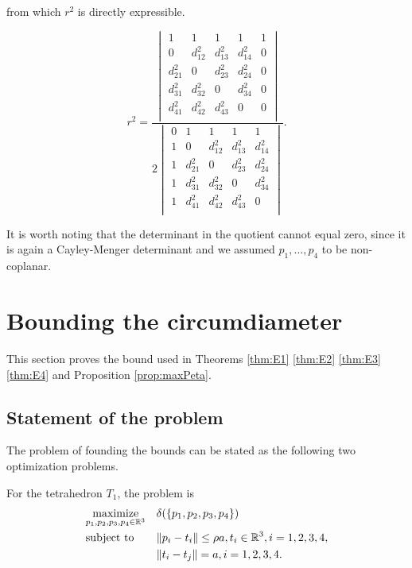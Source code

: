 from which $r^2$ is directly expressible.

\begin{equation}\label{eq:Cayley-Menger-expanded}
r^2 
=
\frac{
\begin{vmatrix}
1 & 1 & 1 & 1 & 1 \\
0 & d^2_{12} & d^2_{13} & d^2_{14} & 0 \\
d^2_{21} & 0 & d^2_{23} & d^2_{24} & 0 \\
d^2_{31} & d^2_{32} & 0 & d^2_{34} & 0 \\ 
d^2_{41} & d^2_{42} & d^2_{43} & 0 & 0 \\
\end{vmatrix}}
{2 \begin{vmatrix}
0 & 1 & 1 & 1 & 1 \\
1 & 0 & d^2_{12} & d^2_{13} & d^2_{14} \\
1 & d^2_{21} & 0 & d^2_{23} & d^2_{24} \\
1 & d^2_{31} & d^2_{32} & 0 & d^2_{34} \\ 
1 & d^2_{41} & d^2_{42} & d^2_{43} & 0 \\
\end{vmatrix} 
}.
\end{equation}

It is worth noting that the determinant in the quotient cannot equal zero, since it is again a Cayley-Menger determinant and we assumed $p_1,\dots,p_4$ to be non-coplanar. 



\section{Bounding the circumdiameter}
This section proves the bound used in Theorems \ref{thm:E1} \ref{thm:E2} \ref{thm:E3} \ref{thm:E4} and Proposition \ref{prop:maxPeta}. 

\subsection{Statement of the problem}

The problem of founding the bounds can be stated as the following two optimization problems. \newline

\noindent For the tetrahedron $T_1$, the problem is 
\begin{equation}\label{prob:tetra1}
\begin{aligned}
& \underset{p_1,p_2,p_3,p_4\in {\mathbb R^3}}{\text{maximize}}
& & \delta(\{p_1,p_2,p_3,p_4\}) \\
& \text{subject to}
& & \| p_i - t_i\| \leq \rho a, t_i\in {\mathbb R^3}, i=1,2,3,4, \\
& & &\|t_i - t_j\| = a, i=1,2,3,4. 
\end{aligned}
\end{equation}

